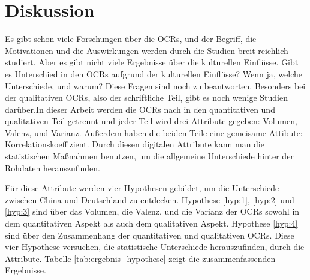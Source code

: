\chapter{Diskussion} \label{diskussion}
Es gibt schon viele Forschungen über die \acl{OCRs}, und der Begriff, die Motivationen und die Auswirkungen werden durch die Studien breit reichlich studiert. Aber es gibt nicht viele Ergebnisse über die kulturellen Einflüsse. Gibt es Unterschied in den \ac{OCRs} aufgrund der kulturellen Einflüsse? Wenn ja, welche Unterschiede, und warum? Diese Fragen sind noch zu beantworten. Besonders bei der qualitativen \ac{OCRs}, also der schriftliche Teil, gibt es noch wenige Studien darüber.In dieser Arbeit werden die \ac{OCRs} nach \citet{Shrihari2012} in den quantitativen und qualitativen Teil getrennt und jeder Teil wird drei Attribute gegeben: Volumen, Valenz, und Varianz. Außerdem haben die beiden Teile eine gemeisame Attibute: Korrelationskoeffizient. Durch diesen digitalen Attribute kann man die statistischen Maßnahmen benutzen, um die allgemeine Unterschiede hinter der Rohdaten herauszufinden.

Für diese Attribute werden vier Hypothesen gebildet, um die Unterschiede zwischen China und Deutschland zu entdecken. Hypothese \ref{hyp:1}, \ref{hyp:2} und \ref{hyp:3} sind über das Volumen, die Valenz, und die Varianz der \ac{OCRs} sowohl in dem quantitativen Aspekt als auch dem qualitativen Aspekt. Hypothese \ref{hyp:4} sind über den Zusammenhang der quantitativen und qualitativen \ac{OCRs}. Diese vier Hypothese versuchen, die statistische Unterschiede herauszufinden, durch die Attribute. Tabelle \ref{tab:ergebnis_hypothese} zeigt die zusammenfassenden Ergebnisse.

\begin{table}[h]
\centering
{}
\caption[Die zusammenfassenden Ergebnisse von Hypothesen]{Die zusammenfassenden Ergebnisse von Hypothesen (*: Ausnahme ist Puma) (Quelle: Eigene Darstellung)}
\label{tab:ergebnis_hypothese}
\end{table}


